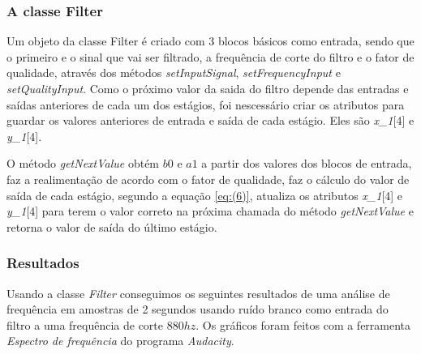 \documentclass{article}
\begin{document}
\subsubsection{A classe Filter}
Um objeto da classe Filter é criado com 
3 blocos básicos como entrada, sendo que o primeiro e o sinal que vai ser filtrado, a frequência de corte do filtro e o fator de qualidade, através dos
métodos \emph{setInputSignal}, \emph{setFrequencyInput} e \emph{setQualityInput}.
Como o próximo valor da saida do filtro depende das entradas e saídas anteriores de cada um dos estágios, foi nescessário criar os atributos
 para guardar os valores anteriores de entrada e saída de cada estágio. Eles são \emph{x\_1}[4] e \emph{y\_1}[4]. 


O método \emph{getNextValue} obtém $b0$ e $a1$ a partir dos valores dos blocos de entrada, faz a realimentação de acordo com o fator de qualidade, 
 faz o cálculo do valor de saída de cada estágio, segundo a equação \ref{eq:(6)}, atualiza os atributos \emph{x\_1}[4] e \emph{y\_1}[4] para terem o valor correto
 na próxima chamada do método \emph{getNextValue} e retorna o valor de saída do último estágio.

\subsubsection{Resultados}


Usando a classe \emph{Filter} conseguimos os seguintes resultados de uma análise de frequência em amostras de 2 segundos usando ruído branco como entrada do filtro
 a uma frequência  de corte $880 hz$. Os gráficos foram feitos com a ferramenta \emph{Espectro de frequência} do programa \emph{Audacity}.
\end{document}
